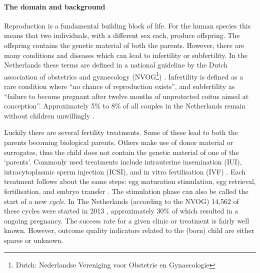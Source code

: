 \paragraph{The domain and background}
Reproduction is a fundamental building block of life.
For the human species this means that two individuals, with a different sex each, produce offspring.
The offspring contains the genetic material of both the parents.
However, there are many conditions and diseases which can lead to infertility or subfertility.
In the Netherlands these terms are defined in a national guideline by the Dutch association of obstetrics and gynaecology (NVOG\footnote{Dutch: Nederlandse Vereniging voor Obstetrie en Gynaecologie}) \cite{subfertilityGuideline}.
Infertility is defined as a rare condition where ``no chance of reproduction exists'', 
and subfertility as ``failure to become pregnant after twelve months of unprotected coitus aimed at conception''.
Approximately 5\% to 8\% of all couples in the Netherlands remain without children unwillingly \cite{cbsStatistics, nhgStatistics}.

Luckily there are several fertility treatments.
Some of these lead to both the parents becoming biological parents. 
Others make use of donor material or surrogates, thus the child does not contain the genetic material of one of the `parents'.
Commonly used treatments include intrauterine insemination (IUI), intracytoplasmic sperm injection (ICSI), and in vitro fertilisation (IVF) \cite{treatmentExplanation}.
Each treatment follows about the same steps: egg maturation stimulation, egg retrieval, fertilisation, and embryo transfer \cite{treatmentExplanation}.
The stimulation phase can also be called the start of a new \emph{cycle}. In The Netherlands (according to the NVOG) 14,562 of these cycles were started in 2013 \cite{ivfReportNVOG2013}, approximately 30\% of which resulted in a ongoing pregnancy.
The success rate for a given clinic or treatment is fairly well known.
However, outcome quality indicators related to the (born) child are either sparse or unknown.

